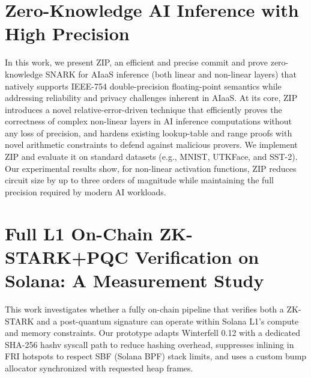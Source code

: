 \documentclass[11pt]{article}
\theoremstyle{definition}
\theoremstyle{remark}
\theoremstyle{plain}
\begin{document}
\section{\cite{cryptoeprint:2025/1732} Zero-Knowledge AI Inference with High Precision}
In this work, we present ZIP, an efficient and precise commit and prove zero-knowledge SNARK for AIaaS inference (both linear and non-linear layers) that natively supports IEEE-754 double-precision floating-point semantics while addressing reliability and privacy challenges inherent in AIaaS. At its core, ZIP introduces a novel relative-error-driven technique that efficiently proves the correctness of complex non-linear layers in AI inference computations without any loss of precision, and hardens existing lookup-table and range proofs with novel arithmetic constraints to defend against malicious provers. We implement ZIP and evaluate it on standard datasets (e.g., MNIST, UTKFace, and SST-2). Our experimental results show, for non-linear activation functions, ZIP reduces circuit size by up to three orders of magnitude while maintaining the full precision required by modern AI workloads.

\section{\cite{cryptoeprint:2025/1741} Full L1 On-Chain ZK-STARK+PQC Verification on Solana: A Measurement Study}
This work investigates whether a fully on-chain pipeline that verifies both a ZK-STARK and a post-quantum signature can operate within Solana L1's compute and memory constraints. Our prototype adapts Winterfell 0.12 with a dedicated SHA-256 hashv syscall path to reduce hashing overhead, suppresses inlining in FRI hotspots to respect SBF (Solana BPF) stack limits, and uses a custom bump allocator synchronized with requested heap frames. 

%
%
\printbibliography
\end{document}
